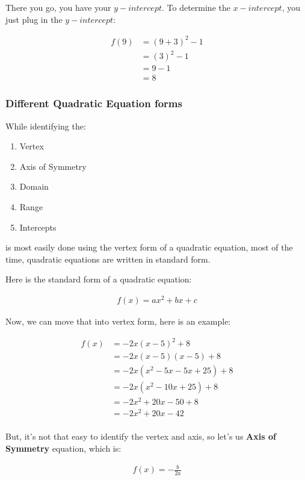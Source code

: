 There you go, you have your $y-intercept$. To determine the $x-intercept$, you just plug in the $y-intercept$:

\begin{align}
    f(9) &= (9 + 3)^2 - 1 \\
         &= (3)^2 - 1 \\
         &= 9 - 1 \\
         &= 8
\end{align}

\subsubsection*{Different Quadratic Equation forms}

While identifying the:

\begin{enumerate}
    \item Vertex
    \item Axis of Symmetry
    \item Domain
    \item Range
    \item Intercepts
\end{enumerate}

is most easily done using the vertex form of a quadratic equation, most of the time, quadratic equations are written in standard form.

Here is the standard form of a quadratic equation:

\begin{align}
    f(x) = ax^2 + bx + c
\end{align}

Now, we can move that into vertex form, here is an example:

\begin{align}
    f(x) &= -2x(x - 5)^2 + 8 \\
         &= -2x(x - 5)(x - 5) + 8 \\
         &= -2x(x^2 - 5x - 5x + 25) + 8 \\
         &= -2x(x^2 - 10x + 25) + 8 \\
         &= -2x^2 + 20x - 50 + 8 \\
         &= -2x^2 + 20x - 42 \\
\end{align}

But, it's not that easy to identify the vertex and axis, so let's us \textbf{Axis of Symmetry} equation, which is:

\begin{align}
    f(x) = -\frac{b}{2a}
\end{align}

